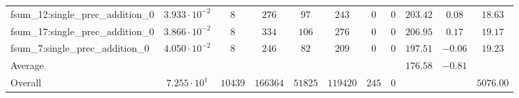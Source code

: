 \begin{tabular}{|l|c|c|c|c|c|c|c|c|c|c|}
fsum\_12:single\_prec\_addition\_0             & $ 3.933 \cdot 10^{-2} $ & $ 8      $ & $ 276    $ & $ 97    $ & $ 243    $ & $ 0   $ & $ 0 $ & $ 203.42      $ & $ 0.08    $ & $ 18.63   $ \\
fsum\_17:single\_prec\_addition\_0             & $ 3.866 \cdot 10^{-2} $ & $ 8      $ & $ 334    $ & $ 106   $ & $ 276    $ & $ 0   $ & $ 0 $ & $ 206.95      $ & $ 0.17    $ & $ 19.17   $ \\
fsum\_7:single\_prec\_addition\_0              & $ 4.050 \cdot 10^{-2} $ & $ 8      $ & $ 246    $ & $ 82    $ & $ 209    $ & $ 0   $ & $ 0 $ & $ 197.51      $ & $ -0.06   $ & $ 19.23   $ \\
\hline
Average                                        & $                     $ & $        $ & $        $ & $       $ & $        $ & $     $ & $   $ & $ 176.58      $ & $ -0.81   $ & $         $ \\
\hline
Overall                                        & $ 7.255 \cdot 10^{1}  $ & $ 10439  $ & $ 166364 $ & $ 51825 $ & $ 119420 $ & $ 245 $ & $ 0 $ & $             $ & $         $ & $ 5076.00 $ \\
\hline
\end{tabular}
